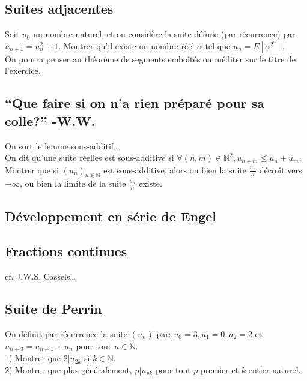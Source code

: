 \documentclass{article}
\begin{document}
\subsection{Suites adjacentes}
Soit $u_0$ un nombre naturel, et on consid\`ere la suite d\'efinie (par r\'ecurrence) par $u_{n+1}=u_n^2+1$. Montrer qu'il existe un nombre r\'eel $\alpha$ tel que $u_n=E[\alpha^{2^n}]$.\\
On pourra penser au th\'eor\`eme de segments embo\^it\'es ou m\'editer sur le titre de l'exercice.

\subsection{``Que faire si on n'a rien pr\'epar\'e pour sa colle?'' -W.W.}
On sort le lemme sous-additif\dots\\
On dit qu'une suite r\'eelles est sous-additive si $\forall (n,m)\in\mathbb{N}^2, u_{n+m}\leq u_n+u_m$. Montrer que si $(u_n)_{n\in\mathbb{N}}$ est sous-additive, alors ou bien la suite $\frac{u_n}{n}$ d\'ecro\^it vers $-\infty$, ou bien la limite de la suite $\frac{u_n}{n}$ existe.

\subsection{D\'eveloppement en s\'erie de Engel}

\subsection{Fractions continues}
cf. J.W.S. Cassels\dots

\subsection{Suite de Perrin}
On d\'efinit par r\'ecurrence la suite $(u_n)$ par: $u_0=3, u_1=0, u_2=2$ et $u_{n+3}=u_{n+1}+u_n$ pour tout $n\in\mathbb{N}$.\\
1) Montrer que $2|u_{2k}$ si $k\in\mathbb{N}$.\\
2) Montrer que plus g\'en\'eralement, $p|u_{pk}$ pour tout $p$ premier et $k$ entier naturel.
\end{document}
